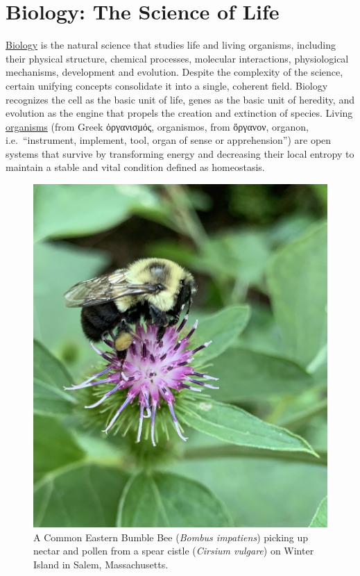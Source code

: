 \hypertarget{biology-the-science-of-life}{%
\chapter{Biology: The Science of Life}\label{biology-the-science-of-life}}

\href{https://en.wikipedia.org/wiki/Biology}{Biology} is the natural
science that studies life and living organisms, including their physical
structure, chemical processes, molecular interactions, physiological
mechanisms, development and evolution. Despite the complexity of the
science, certain unifying concepts consolidate it into a single,
coherent field. Biology recognizes the cell as the basic unit of life,
genes as the basic unit of heredity, and evolution as the engine that
propels the creation and extinction of species. Living
\href{https://en.wikipedia.org/wiki/Organism}{organisms} (from Greek
ὀργανισμός, organismos, from ὄργανον, organon, i.e.~``instrument,
implement, tool, organ of sense or apprehension'') are open systems that
survive by transforming energy and decreasing their local entropy to
maintain a stable and vital condition defined as homeostasis.

\begin{figure}

{\centering \includegraphics[width=0.7\linewidth]{./figures/life/IMG_1024} 

}

\caption{A Common Eastern Bumble Bee (\emph{Bombus impatiens}) picking up nectar and pollen from a spear cistle (\emph{Cirsium vulgare}) on Winter Island in Salem, Massachusetts.}\label{fig:bumblebee}
\end{figure}


